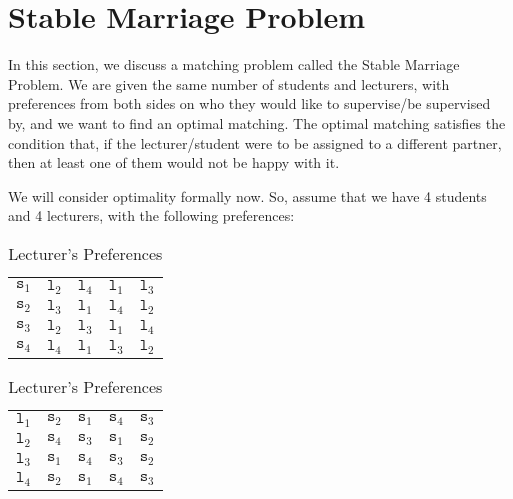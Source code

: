 \documentclass[a4paper, openany]{memoir}
\begin{document}
    \section{Stable Marriage Problem}
    In this section, we discuss a matching problem called the Stable Marriage Problem. We are given the same number of students and lecturers, with preferences from both sides on who they would like to supervise/be supervised by, and we want to find an optimal matching. The optimal matching satisfies the condition that, if the lecturer/student were to be assigned to a different partner, then at least one of them would not be happy with it.

    We will consider optimality formally now. So, assume that we have 4 students and 4 lecturers, with the following preferences:
    \begin{table}[H]
        \centering
        \begin{subtable}{0.45\textwidth}
            \centering
            \begin{tabular}{c|cccc}
                $\texttt{s}_1$ & $\texttt{l}_2$ & $\texttt{l}_4$ & $\texttt{l}_1$ & $\texttt{l}_3$ \\
                $\texttt{s}_2$ & $\texttt{l}_3$ & $\texttt{l}_1$ & $\texttt{l}_4$ & $\texttt{l}_2$ \\
                $\texttt{s}_3$ & $\texttt{l}_2$ & $\texttt{l}_3$ & $\texttt{l}_1$ & $\texttt{l}_4$ \\
                $\texttt{s}_4$ & $\texttt{l}_4$ & $\texttt{l}_1$ & $\texttt{l}_3$ & $\texttt{l}_2$
            \end{tabular}
            \caption{Student's Preferences}
        \end{subtable}
        \hfill
        \begin{subtable}{0.45\textwidth}
            \centering
            \begin{tabular}{c|cccc}
                $\texttt{l}_1$ & $\texttt{s}_2$ & $\texttt{s}_1$ & $\texttt{s}_4$ & $\texttt{s}_3$ \\
                $\texttt{l}_2$ & $\texttt{s}_4$ & $\texttt{s}_3$ & $\texttt{s}_1$ & $\texttt{s}_2$ \\
                $\texttt{l}_3$ & $\texttt{s}_1$ & $\texttt{s}_4$ & $\texttt{s}_3$ & $\texttt{s}_2$ \\
                $\texttt{l}_4$ & $\texttt{s}_2$ & $\texttt{s}_1$ & $\texttt{s}_4$ & $\texttt{s}_3$
            \end{tabular}
            \caption{Lecturer's Preferences}
        \end{subtable}
    \end{table}
\end{document}
